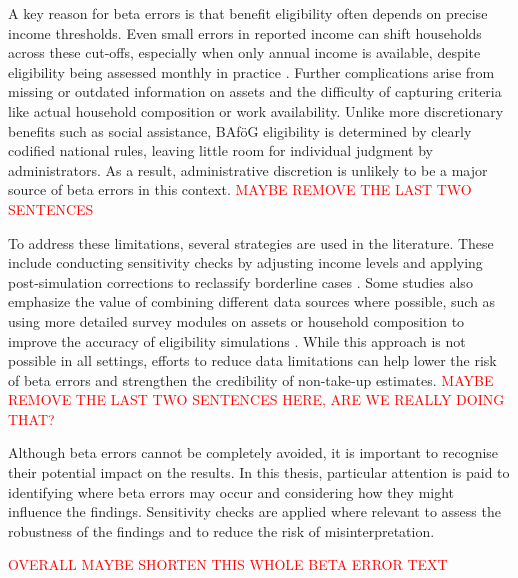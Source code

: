 A key reason for beta errors is that benefit eligibility often depends on precise income thresholds. Even small errors in reported income can shift households across these cut-offs, especially when only annual income is available, despite eligibility being assessed monthly in practice \citep{herber_non-take-up_2019}. Further complications arise from missing or outdated information on assets and the difficulty of capturing criteria like actual household composition or work availability. Unlike more discretionary benefits such as social assistance, BAföG eligibility is determined by clearly codified national rules, leaving little room for individual judgment by administrators. As a result, administrative discretion is unlikely to be a major source of beta errors in this context. \textcolor{red}{MAYBE REMOVE THE LAST TWO SENTENCES}

To address these limitations, several strategies are used in the literature. These include conducting sensitivity checks by adjusting income levels and applying post-simulation corrections to reclassify borderline cases \citep{herber_non-take-up_2019}. Some studies also emphasize the value of combining different data sources where possible, such as using more detailed survey modules on assets or household composition to improve the accuracy of eligibility simulations \citep{janssens_takemod_2022}. While this approach is not possible in all settings, efforts to reduce data limitations can help lower the risk of beta errors and strengthen the credibility of non-take-up estimates. \textcolor{red}{MAYBE REMOVE THE LAST TWO SENTENCES HERE, ARE WE REALLY DOING THAT?}

Although beta errors cannot be completely avoided, it is important to recognise their potential impact on the results. In this thesis, particular attention is paid to identifying where beta errors may occur and considering how they might influence the findings. Sensitivity checks are applied where relevant to assess the robustness of the findings and to reduce the risk of misinterpretation.

\textcolor{red}{OVERALL MAYBE SHORTEN THIS WHOLE BETA ERROR TEXT}